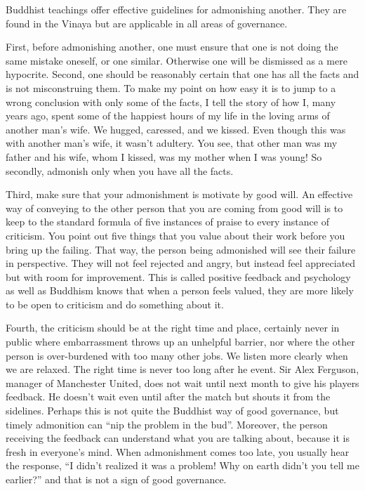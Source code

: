 \documentclass[12pt, openany]{book}
\begin{document}
Buddhist teachings offer effective guidelines for admonishing another. They are found in the Vinaya but are applicable in all areas of governance.

First, before admonishing another, one must ensure that one is not doing the same mistake oneself, or one similar. Otherwise one will be dismissed as a mere hypocrite.
Second, one should be reasonably certain that one has all the facts and is not misconstruing them. To make my point on how easy it is to jump to a wrong conclusion with only some of the facts, I tell the story of how I, many years ago, spent some of the happiest hours of my life in the loving arms of another man’s wife. We hugged, caressed, and we kissed. Even though this was with another man’s wife, it wasn’t adultery. You see, that other man was my father and his wife, whom I kissed, was my mother when I was young! So secondly, admonish only when you have all the facts.

Third, make sure that your admonishment is motivate by good will. An effective way of conveying to the other person that you are coming from good will is to keep to the standard formula of five instances of praise to every instance of criticism. You point out five things that you value about their work before you bring up the failing. That way, the person being admonished will see their failure in perspective. They will not feel rejected and angry, but instead feel appreciated but with room for improvement. This is called positive feedback and psychology as well as Buddhism knows that when a person feels valued, they are more likely to be open to criticism and do something about it.

Fourth, the criticism should be at the right time and place, certainly never in public where embarrassment throws up an unhelpful barrier, nor where the other person is over-burdened with too many other jobs. We listen more clearly when we are relaxed. The right time is never too long after he event. Sir Alex Ferguson, manager of Manchester United, does not wait until next month to give his players feedback. He doesn’t wait even until after the match but shouts it from the sidelines. Perhaps this is not quite the Buddhist way of good governance, but timely admonition can “nip the problem in the bud”. Moreover, the person receiving the feedback can understand what you are talking about, because it is fresh in everyone’s mind. When admonishment comes too late, you usually hear the response, “I didn’t realized it was a problem! Why on earth didn’t you tell me earlier?” and that is not a sign of good governance.
\end{document}
